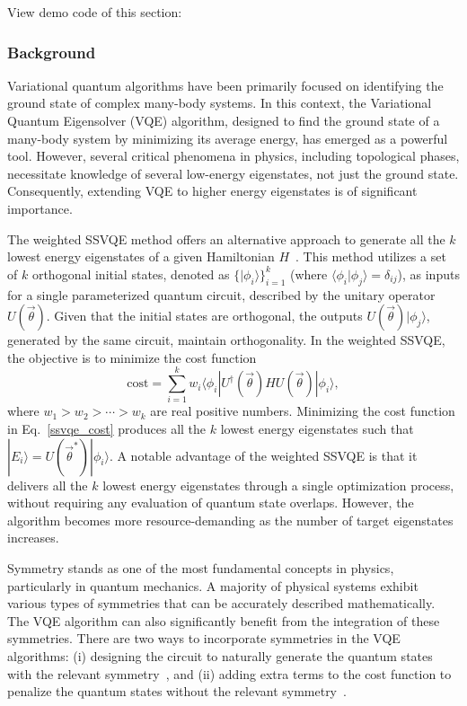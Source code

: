 View demo code of this section:  \ 

\subsubsection{Background}
Variational quantum algorithms have been primarily focused on identifying the ground state of complex many-body systems. In this context, the Variational Quantum Eigensolver (VQE) algorithm, designed to find the ground state of a many-body system  by minimizing its average energy, has emerged as a powerful tool. However, several critical phenomena in physics, including topological phases, necessitate knowledge of several low-energy eigenstates, not just the ground state. Consequently, extending VQE to higher energy eigenstates is of significant importance.

The weighted SSVQE method offers an alternative approach to generate all the $k$ lowest energy eigenstates of a given Hamiltonian $H$~\cite{nakanishi2019subspace}. This method utilizes a set of $k$ orthogonal initial states, denoted as $\{|\phi_{i}\rangle\}_{i=1}^{k}$ (where $\langle \phi_{i} | \phi_{j} \rangle = \delta_{ij}$), as inputs for a single parameterized quantum circuit, described by the unitary operator $U(\vec{\theta})$. Given that the initial states are orthogonal, the outputs $U(\vec{\theta})| \phi_{j} \rangle$, generated by the same circuit, maintain orthogonality. In the weighted SSVQE, the objective is to minimize the cost function
\begin{equation}
    \mathrm{cost} = \sum_{i=1}^{k} w_{i} \langle \phi_{i}| U^{\dagger}(\vec{\theta}) H U(\vec{\theta}) | \phi_{i} \rangle,
    \label{ssvqe_cost}
\end{equation}
where $w_1 > w_2 > \cdots > w_k$ are real positive numbers. Minimizing the cost function in Eq.~\eqref{ssvqe_cost} produces all the $k$ lowest energy eigenstates such that $|E_{i}\rangle = U(\vec{\theta}^{*})|\phi_{i}\rangle$.
A notable advantage of the weighted SSVQE is that it delivers all the $k$ lowest energy eigenstates through a single optimization process, without requiring any evaluation of quantum state overlaps. However, the algorithm becomes more resource-demanding as the number of target eigenstates increases.

Symmetry stands as one of the most fundamental concepts in physics, particularly in quantum mechanics. A majority of physical systems exhibit various types of symmetries that can be accurately described mathematically. The VQE algorithm can also significantly benefit from the integration of these symmetries. There are two ways to incorporate symmetries in the VQE algorithms: (i) designing the circuit to naturally generate the quantum states with the relevant symmetry~\cite{Lyu2020accelerated,Gard2020,barron2021preserving}, and (ii) adding extra terms to the cost function to penalize the quantum states without the relevant symmetry~\cite{mcclean2016theory,ryabinkin2018constrained}.

